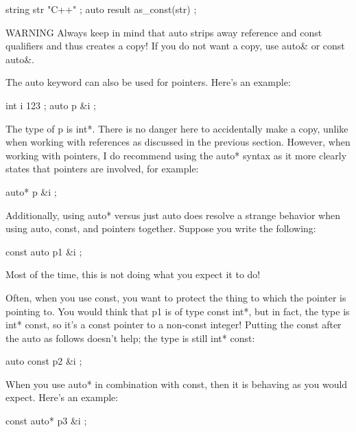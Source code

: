 \begin{cpp}
string str { "C++" };
auto result { as_const(str) };
\end{cpp}

\begin{myWarning}{WARNING}
Always keep in mind that auto strips away reference and const qualifiers and thus creates a copy! If you do not want a copy, use auto\& or const auto\&.
\end{myWarning}


The auto keyword can also be used for pointers. Here’s an example:

\begin{cpp}
int i { 123 };
auto p { &i };
\end{cpp}

The type of p is int*. There is no danger here to accidentally make a copy, unlike when working with references as discussed in the previous section. However, when working with pointers, I do recommend using the auto* syntax as it more clearly states that pointers are involved, for example:

\begin{cpp}
auto* p { &i };
\end{cpp}

Additionally, using auto* versus just auto does resolve a strange behavior when using auto, const, and pointers together. Suppose you write the following:

\begin{cpp}
const auto p1 { &i };
\end{cpp}

Most of the time, this is not doing what you expect it to do!

Often, when you use const, you want to protect the thing to which the pointer is pointing to. You would think that p1 is of type const int*, but in fact, the type is int* const, so it’s a const pointer to a non-const integer! Putting the const after the auto as follows doesn’t help; the type is still int* const:

\begin{cpp}
auto const p2 { &i };
\end{cpp}

When you use auto* in combination with const, then it is behaving as you would expect. Here’s an example:

\begin{cpp}
const auto* p3 { &i };
\end{cpp}

